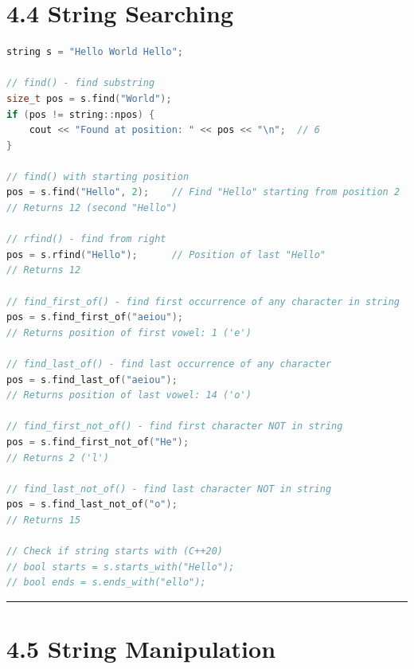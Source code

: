 \hypertarget{string-searching}{%
\section{4.4 String Searching}\label{string-searching}}

\begin{lstlisting}[language={C++}]
string s = "Hello World Hello";

// find() - find substring
size_t pos = s.find("World");
if (pos != string::npos) {
    cout << "Found at position: " << pos << "\n";  // 6
}

// find() with starting position
pos = s.find("Hello", 2);    // Find "Hello" starting from position 2
// Returns 12 (second "Hello")

// rfind() - find from right
pos = s.rfind("Hello");      // Position of last "Hello"
// Returns 12

// find_first_of() - find first occurrence of any character in string
pos = s.find_first_of("aeiou");
// Returns position of first vowel: 1 ('e')

// find_last_of() - find last occurrence of any character
pos = s.find_last_of("aeiou");
// Returns position of last vowel: 14 ('o')

// find_first_not_of() - find first character NOT in string
pos = s.find_first_not_of("He");
// Returns 2 ('l')

// find_last_not_of() - find last character NOT in string
pos = s.find_last_not_of("o");
// Returns 15

// Check if string starts with (C++20)
// bool starts = s.starts_with("Hello");
// bool ends = s.ends_with("ello");
\end{lstlisting}

\begin{center}\rule{0.5\linewidth}{0.5pt}\end{center}

\hypertarget{string-manipulation}{%
\section{4.5 String Manipulation}\label{string-manipulation}}

